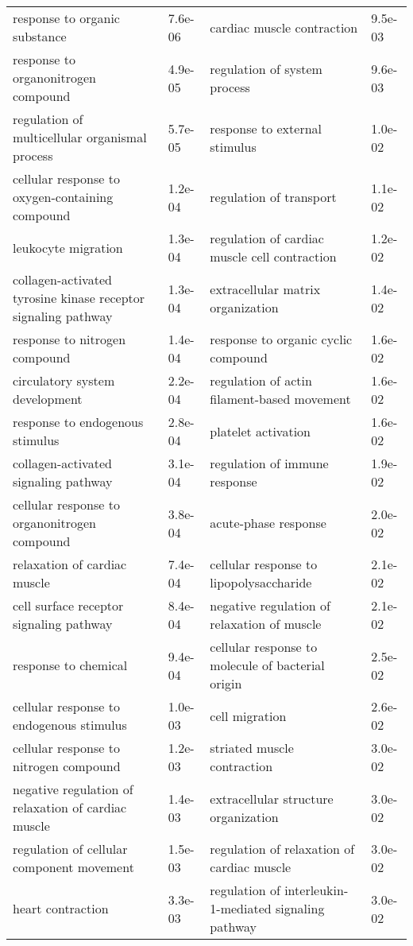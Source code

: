 \documentclass[fleqn,10pt]{SelfArx} %
\begin{document}
\begin{table}[!htb]
\begin{tabularx}{\textwidth}{XlXl}
		response to organic substance & 7.6e-06 & cardiac muscle contraction & 9.5e-03 \\ 
		response to organonitrogen compound & 4.9e-05 & regulation of system process & 9.6e-03 \\ 
		regulation of multicellular organismal process & 5.7e-05 & response to external stimulus & 1.0e-02 \\ 
		cellular response to oxygen-containing compound & 1.2e-04 & regulation of transport & 1.1e-02 \\ 
		leukocyte migration & 1.3e-04 & regulation of cardiac muscle cell contraction & 1.2e-02 \\ 
		collagen-activated tyrosine kinase receptor signaling pathway & 1.3e-04 & extracellular matrix organization & 1.4e-02 \\ 
		response to nitrogen compound & 1.4e-04 & response to organic cyclic compound & 1.6e-02 \\ 
		circulatory system development & 2.2e-04 & regulation of actin filament-based movement & 1.6e-02 \\ 
		response to endogenous stimulus & 2.8e-04 & platelet activation & 1.6e-02 \\ 
		collagen-activated signaling pathway & 3.1e-04 & regulation of immune response & 1.9e-02 \\ 
		cellular response to organonitrogen compound & 3.8e-04 & acute-phase response & 2.0e-02 \\ 
		relaxation of cardiac muscle & 7.4e-04 & cellular response to lipopolysaccharide & 2.1e-02 \\ 
		cell surface receptor signaling pathway & 8.4e-04 & negative regulation of relaxation of muscle & 2.1e-02 \\ 
		response to chemical & 9.4e-04 & cellular response to molecule of bacterial origin & 2.5e-02 \\ 
		cellular response to endogenous stimulus & 1.0e-03 & cell migration & 2.6e-02 \\ 
		cellular response to nitrogen compound & 1.2e-03 & striated muscle contraction & 3.0e-02 \\ 
		negative regulation of relaxation of cardiac muscle & 1.4e-03 & extracellular structure organization & 3.0e-02 \\ 
		regulation of cellular component movement & 1.5e-03 & regulation of relaxation of cardiac muscle & 3.0e-02 \\ 
		heart contraction & 3.3e-03 & regulation of interleukin-1-mediated signaling pathway & 3.0e-02 \\ 

\end{tabularx}
\end{table}
\end{document}
